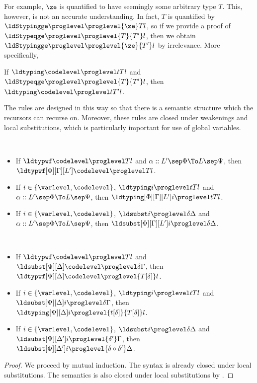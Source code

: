 For example, $\ze$ is quantified to have seemingly some arbitrary type $T$. %
This, however, is not an accurate understanding. %
In fact, $T$ is quantified by $\ldStypingge \proglevel \proglevel{\ze}T l$, so if we provide a proof of
$\ldStypeqge \proglevel \proglevel{T}{T'}l$, then we obtain $\ldStypingge \proglevel \proglevel{\ze}{T'} l$ by
irrelevance. %
More specifically,
\begin{lemma}[Conversion]
  If $\ldtyping \codelevel \proglevel t T l$ and $\ldStypeqge \proglevel \proglevel{T}{T'}l$, then $\ldtyping \codelevel \proglevel t{T'} l$.
\end{lemma}
The rules are designed in this way so that there is a semantic structure which the
recursors can recurse on. %
Moreover, these rules are closed under weakenings and local substitutions, which is particularly
important for use of global variables.
\begin{lemma}[Weakenings] $ $
  \begin{itemize}
  \item If $\ldtypwf \codelevel \proglevel T l$ and $\alpha :: L' \sep \Phi \To L \sep \Psi$,
    then $\ldtypwf[\Phi][\Gamma][L'] \codelevel \proglevel T l$.
  \item If $i \in \{\varlevel, \codelevel\}$, $\ldtyping i \proglevel t T l$ and $\alpha :: L' \sep \Phi \To L \sep \Psi$,
    then $\ldtyping[\Phi][\Gamma][L'] i \proglevel t T l$.
  \item If $i \in \{\varlevel, \codelevel\}$, $\ldsubst i \proglevel \delta\Delta$ and
    $\alpha :: L' \sep \Phi \To L \sep \Psi$, then
    $\ldsubst[\Phi][\Gamma][L'] i \proglevel \delta\Delta$.
  \end{itemize}
\end{lemma}

\begin{lemma} $ $
  \begin{itemize}
  \item If $\ldtypwf \codelevel \proglevel T l$ and $\ldsubst[\Psi][\Delta] \codelevel \proglevel \delta\Gamma$,
    then $\ldtypwf[\Psi][\Delta] \codelevel \proglevel {T[\delta]} l$.
  \item If $i \in \{\varlevel, \codelevel\}$, $\ldtyping i \proglevel t T l$ and $\ldsubst[\Psi][\Delta] i \proglevel \delta\Gamma$,
    then $\ldtyping[\Psi][\Delta] i \proglevel {t[\delta]}{T[\delta]} l$.
  \item If $i \in \{\varlevel, \codelevel\}$, $\ldsubst i \proglevel \delta\Delta$ and
    $\ldsubst[\Psi][\Delta'] i \proglevel{\delta'}\Gamma$, then
    $\ldsubst[\Phi][\Delta'] i \proglevel{\delta \circ \delta'}\Delta$.
  \end{itemize}
\end{lemma}
\begin{proof}
  We proceed by mutual induction. %
  The syntax is already closed under local substitutions. %
  The semantics is also closed under local substitutions by . 
\end{proof}

